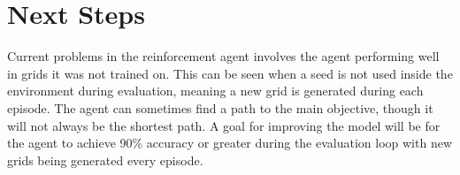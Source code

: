 \documentclass[12pt]{article}
\begin{document}
    \section*{Next Steps}
    Current problems in the reinforcement agent involves the agent performing well in grids it was not trained on.
    This can be seen when a seed is not used inside the environment during evaluation, meaning a new grid is generated during each episode.
    The agent can sometimes find a path to the main objective, though it will not always be the shortest path.
    A goal for improving the model will be for the agent to achieve 90\% accuracy or greater during the evaluation loop with new grids being generated every episode. 
\end{document}
